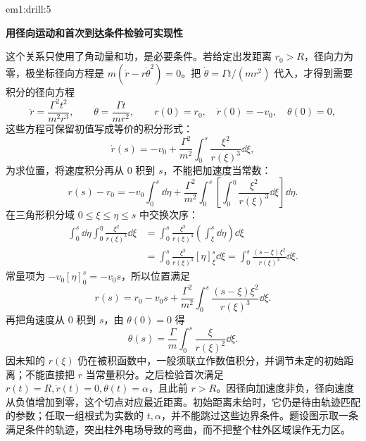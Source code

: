 \begin{drillsolution}{em1:drill:5}
\par\medskip{}\noindent\textbf{用径向运动和首次到达条件检验可实现性}\par\nobreak
这个关系只使用了角动量和功，是必要条件。若给定出发距离 $r_0>R$，径向力为零，极坐标径向方程是
$m(\ddot r-r\dot\theta^2)=0$。把 $\dot\theta=\Gamma t/(mr^2)$ 代入，才得到需要积分的径向方程
\[
\ddot r=\frac{\Gamma^2t^2}{m^2r^3},\qquad
\dot\theta=\frac{\Gamma t}{mr^2},\qquad
r(0)=r_0,\quad\dot r(0)=-v_0,\quad\theta(0)=0,
\]
这些方程可保留初值写成等价的积分形式：
\[
\dot r(s)=-v_0+\frac{\Gamma^2}{m^2}
\int_0^s\frac{\xi^2}{r(\xi)^3}\dd\xi,
\]
为求位置，将速度积分再从 $0$ 积到 $s$，不能把加速度当常数：
\[
 r(s)-r_0=-v_0\int_0^s\dd\eta
 +\frac{\Gamma^2}{m^2}\int_0^s
   \left[\int_0^\eta\frac{\xi^2}{r(\xi)^3}\dd\xi\right]\dd\eta.
\]
在三角形积分域 $0\le\xi\le\eta\le s$ 中交换次序：
\[
 \begin{aligned}
 \int_0^s\!\dd\eta\int_0^\eta\frac{\xi^2}{r(\xi)^3}\dd\xi
 &=\int_0^s\frac{\xi^2}{r(\xi)^3}
     \left(\int_\xi^s\dd\eta\right)\dd\xi\\
 &=\int_0^s\frac{\xi^2}{r(\xi)^3}[\eta]_\xi^s\dd\xi
 =\int_0^s\frac{(s-\xi)\xi^2}{r(\xi)^3}\dd\xi.
 \end{aligned}
\]
常量项为 $-v_0[\eta]_0^s=-v_0s$，所以位置满足
\[
 r(s)=r_0-v_0s+\frac{\Gamma^2}{m^2}
 \int_0^s\frac{(s-\xi)\xi^2}{r(\xi)^3}\dd\xi.
\]
再把角速度从 $0$ 积到 $s$，由 $\theta(0)=0$ 得
\[
 \theta(s)=\frac{\Gamma}{m}\int_0^s\frac{\xi}{r(\xi)^2}\dd\xi.
\]
因未知的 $r(\xi)$ 仍在被积函数中，一般须联立作数值积分，并调节未定的初始距离；不能直接把 $r$ 当常量积分。之后检验首次满足 $r(t)=R,\dot r(t)=0,\theta(t)=\alpha$，且此前 $r>R$。因径向加速度非负，径向速度从负值增加到零，这个切点对应最近距离。初始距离未给时，它仍是待由轨迹匹配的参数；任取一组根式为实数的 $t,\alpha$，并不能跳过这些边界条件。题设图示取一条满足条件的轨迹，突出柱外电场导致的弯曲，而不把整个柱外区域误作无力区。
\end{drillsolution}
